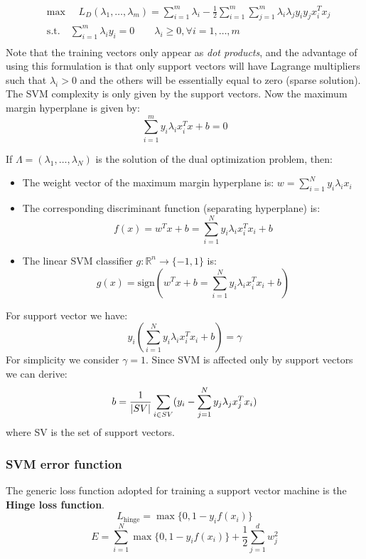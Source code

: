 \begin{equation*}
\begin{aligned}
&\text{max }\quad L_D(\lambda_1,\dots,\lambda_m) = \sum_{i = 1}^{m}\lambda_i - \frac{1}{2}\sum_{i = 1}^{m}\sum_{j = 1}^{m}\lambda_i\lambda_jy_iy_jx_i^Tx_j\\
&\text{s.t.} \quad \sum_{i = 1}^{m}\lambda_iy_i= 0 \qquad \lambda_i \geq 0, \forall i = 1,\dots,m\\
\end{aligned}
\end{equation*}
Note that the training vectors only appear as \textit{dot products}, and the advantage of using this formulation is that only support vectors will have Lagrange multipliers such that $\lambda_i > 0$ and the others will be essentially equal to zero (sparse solution). The SVM complexity is only given by the support vectors. Now the maximum margin hyperplane is given by:
$$\sum_{i = 1}^{m} y_i \lambda_ix_i^Tx+b = 0$$

If $\Lambda = (\lambda_1,\dots, \lambda_N)$ is the solution of the dual optimization problem, then:
\begin{itemize}
	\item The weight vector of the maximum margin hyperplane is:
	$w = \sum_{i = 1}^{N} y_i\lambda_ix_i$
	\item The corresponding discriminant function (separating hyperplane) is:
	$$f(x) = w^Tx+b =  \sum_{i = 1}^{N} y_i\lambda_ix_i^Tx_i + b$$
	\item The linear SVM classifier $g: \mathbb{R}^n \rightarrow \{-1,1\}$ is:
	$$g(x) = \text{sign}(w^Tx+b =  \sum_{i = 1}^{N} y_i\lambda_ix_i^Tx_i + b)$$
\end{itemize}
For support vector we have:
$$y_i(\sum_{i = 1}^{N} y_i\lambda_ix_i^Tx_i + b) = \gamma$$
For simplicity we consider $\gamma = 1$. Since SVM is affected only by support vectors we can derive:
$$b = \frac{1}{|SV|}\sum_{i\in SV}\Large(y_i-\sum_{j=1}^{N}y_j\lambda_jx_j^Tx_i\Large)$$
where SV is the set of support vectors.

\subsubsection{SVM error function}
The generic loss function adopted for training a support vector machine is the \textbf{Hinge loss function}. 
$$L_{\text{hinge}} = \max \{0, 1- y_if(x_i)\}$$
$$E = \sum\limits_{i=1}^N\max\{0,1-y_if(x_i)\}+\frac{1}{2}\sum\limits_{j = 1}^dw_j^2$$

